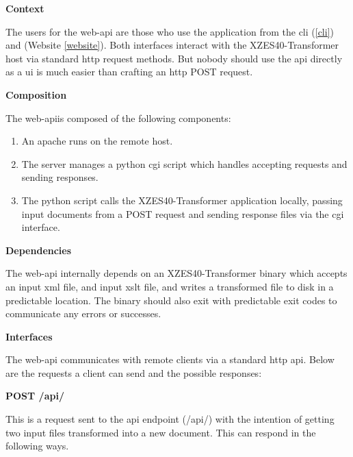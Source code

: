 \textbf{Context}

The users for the \gls{web-api} are those who use the application from the \gls{cli} (\ref{cli}) and (Website \ref{website}).
Both interfaces interact with the XZES40-Transformer host via standard \gls{http} request methods.
But nobody should use the \gls{api} directly as a \gls{ui} is much easier than crafting an \gls{http} POST request.

\textbf{Composition}

The \gls{web-api}is composed of the following components:

\begin{enumerate}
  \item  An \gls{apache} runs on the remote host.\cite{apache-server}
  \item The server manages a \gls{python} \gls{cgi} script which handles accepting requests and sending responses.
  \item The \gls{python} script calls the XZES40-Transformer application locally, passing input documents from a POST request and sending response files via the \gls{cgi} interface.
\end{enumerate}

\textbf{Dependencies}

The \gls{web-api} internally depends on an XZES40-Transformer binary which accepts an input \gls{xml} file, and input \gls{xslt} file, and writes a transformed file to disk in a predictable location.
The binary should also exit with predictable exit codes to communicate any errors or successes.

\textbf{Interfaces}

The \gls{web-api} communicates with remote clients via a standard \gls{http} \gls{api}.
Below are the requests a client can send and the possible responses:

\textbf{POST /api/}

This is a request sent to the \gls{api} endpoint (/api/) with the intention of getting two input files transformed into a new document.
This can respond in the following ways.

